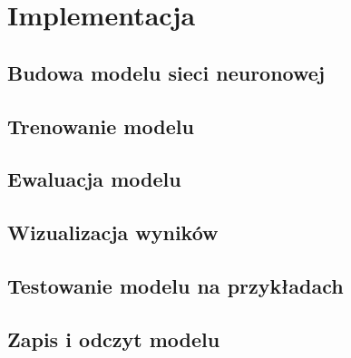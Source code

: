 \chapter{Implementacja}
\section{Budowa modelu sieci neuronowej}
\section{Trenowanie modelu}
\section{Ewaluacja modelu}
\section{Wizualizacja wyników}
\section{Testowanie modelu na przykładach}
\section{Zapis i odczyt modelu}